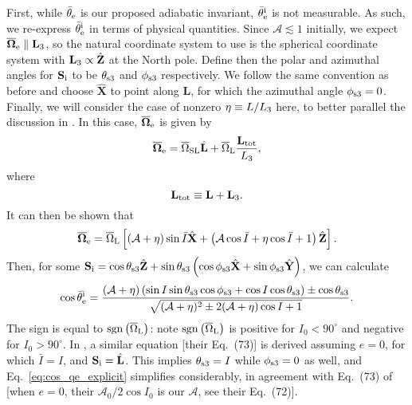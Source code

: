 \documentclass[
        twocolumn,
        twocolappendix
    ]{aastex63}
\renewcommand*{\bm}[1]{\boldsymbol{\mathbf{#1}}}
\newcommand*{\uv}[1]{\hat{\bm{#1}}}
\newcommand*{\p}[1]{\left(#1\right)}
\newcommand*{\s}[1]{\left[#1\right]}
\begin{document}
First, while $\bar{\theta}_{\rm e}$ is our proposed adiabatic invariant,
$\bar{\theta}_{\rm e}^{\rm i}$ is not measurable. As such, we re-express
$\bar{\theta}_{\rm e}^{\rm i}$ in terms of physical quantities. Since
$\mathcal{A}
\lesssim 1$ initially, we expect $\bm{\overline{\Omega}}_{\rm e} \parallel
\bm{L}_{\rm 3}$, so the natural coordinate system to use is the spherical
coordinate system with $\bm{L}_{\rm 3} \propto \uv{Z}$ at the North pole. Define
then the polar and azimuthal angles for $\bm{S}_{\rm i}$ to be $\theta_{\rm s3}$
and $\phi_{ \rm s3}$ respectively. We follow the same convention as before and
choose $\uv{X}$ to point along $\bm{L}$, for which the azimuthal angle
$\phi_{\rm s3} = 0$. Finally, we will consider the case of nonzero $\eta \equiv
L / L_{\rm 3}$ here, to better parallel the discussion in \citet{bin2}. In this
case, $\bm{\overline{\Omega}}_{\rm e}$ is given by
\begin{equation}
    \bm{\overline{\Omega}}_{\rm e} = \overline{\Omega}_{\rm SL} \uv{L}
        + \overline{\Omega}_{\rm L}\frac{\bm{L}_{\rm tot}}{L_3},
\end{equation}
where
\begin{equation}
    \bm{L}_{\rm tot} \equiv \bm{L} + \bm{L}_{\rm 3}.
\end{equation}
It can then be shown that
\begin{equation}
    \bm{\overline{\Omega}}_{\rm e} = \overline{\Omega}_{\rm L}\s{\p{
        \mathcal{A} + \eta}\sin \bar{I} \uv{X} + \p{\mathcal{A}\cos \bar{I} +
        \eta\cos \bar{I} + 1} \uv{Z}}.
\end{equation}
Then, for some $\bm{S}_{\rm i} = \cos \theta_{\rm s3} \uv{Z} + \sin \theta_{\rm
s3}\p{\cos \phi_{\rm s3}\uv{X} + \sin \phi_{\rm s3}\uv{Y}}$, we can calculate
\begin{equation}
    \cos \bar{\theta}_{\rm e}^{\rm i} =
        \frac{\p{\mathcal{A} + \eta}\p{\sin I \sin \theta_{\rm s3} \cos \phi_{\rm s3}
            + \cos I \cos \theta_{\rm s3}} \pm \cos \theta_{\rm s3}}{
        \sqrt{(\mathcal{A} + \eta)^2 \pm 2(\mathcal{A} + \eta)\cos I +
            1}}.\label{eq:cos_qe_explicit}
\end{equation}
The sign is equal to $\mathrm{sgn}\p{\overline{\Omega}_{\rm L}}$: note
$\mathrm{sgn}\p{\overline{\Omega}_{\rm L}}$ is positive for $I_0 < 90^\circ$ and
negative for $I_0 > 90^\circ$. In \citet{bin2}, a similar equation [their
Eq.~(73)] is derived assuming $e = 0$, for which $\bar{I} = I$, and $\bm{S}_{\rm
i} = \uv{L}$. This implies $\theta_{\rm s3} = I$ while $\phi_{\rm s3} = 0$ as
well, and Eq.~\eqref{eq:cos_qe_explicit} simplifies considerably, in agreement
with Eq.~(73) of \citet{bin2} [when $e = 0$, their $\mathcal{A}_0 / 2 \cos I_0$
is our $\mathcal{A}$, see their Eq.~(72)].
\end{document}
